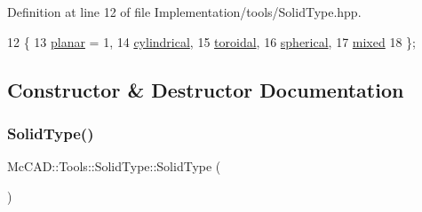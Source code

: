 Definition at line 12 of file Implementation/tools/\+Solid\+Type.\+hpp.


\begin{DoxyCode}
12                         \{
13         \hyperlink{classMcCAD_1_1Tools_1_1SolidType_a69c62abbe9fa709ccbaf47d4daf356e1a03cc49496c89d07ea5f8ef75c4912243}{planar} = 1,
14         \hyperlink{classMcCAD_1_1Tools_1_1SolidType_a69c62abbe9fa709ccbaf47d4daf356e1aed38f6feaeb26f0baf2614a0d421b638}{cylindrical},
15         \hyperlink{classMcCAD_1_1Tools_1_1SolidType_a69c62abbe9fa709ccbaf47d4daf356e1ad9493def4181ec95fec305f92c8ba5f0}{toroidal},
16         \hyperlink{classMcCAD_1_1Tools_1_1SolidType_a69c62abbe9fa709ccbaf47d4daf356e1aab73308273ab560262a29dbc877d5806}{spherical},
17         \hyperlink{classMcCAD_1_1Tools_1_1SolidType_a69c62abbe9fa709ccbaf47d4daf356e1a506dbe9f789bfe40322100b59064e521}{mixed}
18     \};
\end{DoxyCode}


\subsection{Constructor \& Destructor Documentation}
\mbox{\label{classMcCAD_1_1Tools_1_1SolidType_ac0567cd77239b78645632ac3646f99de}} 
\subsubsection{\texorpdfstring{Solid\+Type()}{SolidType()}\hspace{0.1cm}{\footnotesize\ttfamily [1/2]}}
{\footnotesize\ttfamily Mc\+C\+A\+D\+::\+Tools\+::\+Solid\+Type\+::\+Solid\+Type (\begin{DoxyParamCaption}{ }\end{DoxyParamCaption})\hspace{0.3cm}{\ttfamily [default]}}

\mbox{\label{classMcCAD_1_1Tools_1_1SolidType_ac0567cd77239b78645632ac3646f99de}} 
